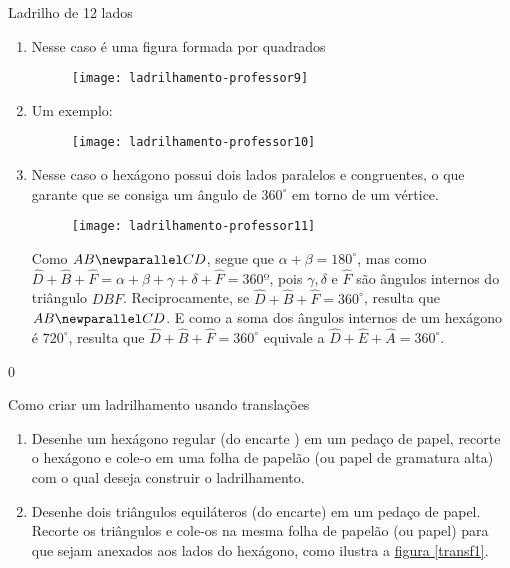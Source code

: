 {\begin{answer}{Ladrilho de 12 lados}
{\begin{enumerate}
\begin{figure}[H]
	\texttt{[image: ladrilhamento-professor8]}
	\end{figure}
	\item Nesse caso é uma figura formada por quadrados
	{
	\begin{figure}[H]
	\centering
	
	\texttt{[image: ladrilhamento-professor9]}
	\end{figure}
	}
	\item Um exemplo:
	{
	\begin{figure}[H]
	\centering
	
	\texttt{[image: ladrilhamento-professor10]}
	\end{figure}
	}
	\clearpage
	\item Nesse caso o hexágono possui dois lados paralelos e congruentes, o que garante que se consiga um ângulo de $360^{\circ}$ em torno de um vértice.
	\begin{figure}[H]
	\centering
	
	\texttt{[image: ladrilhamento-professor11]}
	\end{figure}

	Como $AB\newparallel CD$, segue que $\alpha+\beta=180^{\circ}$, mas como $\hat{D}+\hat{B}+\hat{F}=\alpha+\beta+\gamma+\delta+\hat{F}= 360º$, pois $\gamma,\delta$ e $\hat{F}$ são ângulos internos do triângulo $DBF$. Reciprocamente, se $\hat{D}+\hat{B}+\hat{F}=360^{\circ}$, resulta que $AB \newparallel CD$.
	E como a soma dos ângulos internos de um hexágono é $720^{\circ}$, resulta que  $\hat{D}+\hat{B}+\hat{F}=360^{\circ}$ equivale a  $\hat{D}+\hat{E}+\hat{A} = 360^{\circ}$.
	\end{enumerate}
}{0}
\end{answer}

\vspace{-.5em}

\begin{task}{Como criar um ladrilhamento usando translações}

\begin{enumerate}
	\item Desenhe um hexágono regular (do encarte ) em um pedaço de papel, recorte o hexágono e cole-o em uma folha de papelão (ou papel de gramatura  alta) com o qual deseja construir o ladrilhamento.
	\item Desenhe dois triângulos equiláteros (do encarte) em um pedaço de papel. Recorte os triângulos e cole-os na mesma folha de papelão (ou papel) para que sejam anexados aos lados do hexágono, como ilustra a \hyperref[transf1]{figura \ref{transf1}}.


\end{enumerate}
\end{task}}
